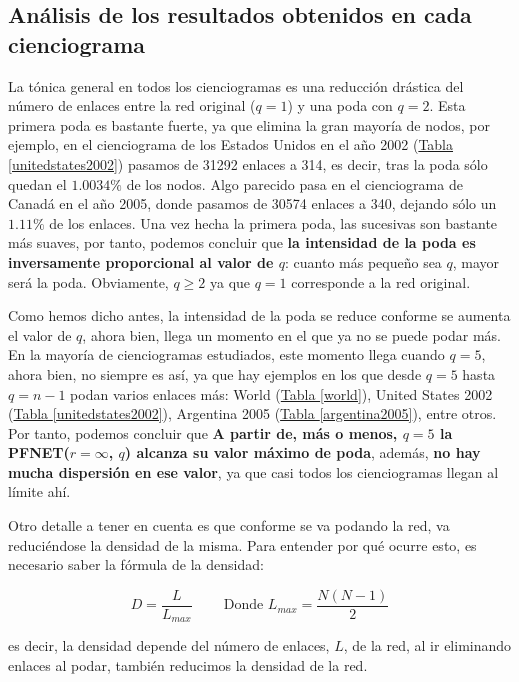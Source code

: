 \documentclass[10pt,a4paper,spanish]{article}
\numberwithin{equation}{section} %
\numberwithin{figure}{section} %
\numberwithin{table}{section} %
\begin{document}
\subsection{Análisis de los resultados obtenidos en cada cienciograma}
La tónica general en todos los cienciogramas es una reducción drástica del número de enlaces entre la red original ($q = 1$) y una poda con $q = 2$. Esta primera poda es bastante fuerte, ya que elimina la gran mayoría de nodos, por ejemplo, en el cienciograma de los Estados Unidos en el año 2002 (\hyperref[unitedstates2002]{Tabla \ref*{unitedstates2002}}) pasamos de 31292 enlaces a 314, es decir, tras la poda sólo quedan el $1.0034\%$ de los nodos. Algo parecido pasa en el cienciograma de Canadá en el año 2005, donde pasamos de 30574 enlaces a 340, dejando sólo un $1.11\%$ de los enlaces. Una vez hecha la primera poda, las sucesivas son bastante más suaves, por tanto, podemos concluir que \textbf{la intensidad de la poda es inversamente proporcional al valor de $q$}: cuanto más pequeño sea $q$, mayor será la poda. Obviamente, $q \geq 2$ ya que $q = 1$ corresponde a la red original.

Como hemos dicho antes, la intensidad de la poda se reduce conforme se aumenta el valor de $q$, ahora bien, llega un momento en el que ya no se puede podar más. En la mayoría de cienciogramas estudiados, este momento llega cuando $q = 5$, ahora bien, no siempre es así, ya que hay ejemplos en los que desde $q = 5$ hasta $q = n-1$ podan varios enlaces más: World (\hyperref[world]{Tabla \ref*{world}}), United States 2002 (\hyperref[unitedstates2002]{Tabla \ref*{unitedstates2002}}), Argentina 2005 (\hyperref[argentina2005]{Tabla \ref*{argentina2005}}), entre otros. Por tanto, podemos concluir que \textbf{A partir de, más o menos, $q = 5$ la PFNET($r = \infty$, $q$) alcanza su valor máximo de poda}, además, \textbf{no hay mucha dispersión en ese valor}, ya que casi todos los cienciogramas llegan al límite ahí.

Otro detalle a tener en cuenta es que conforme se va podando la red, va reduciéndose la densidad de la misma. Para entender por qué ocurre esto, es necesario saber la fórmula de la densidad:

\begin{displaymath}
    D = \frac{L}{L_{max}} \qquad\ \textrm{Donde } L_{max} = \frac{N(N-1)}{2}
\end{displaymath}

es decir, la densidad depende del número de enlaces, $L$, de la red, al ir eliminando enlaces al podar, también reducimos la densidad de la red.
\end{document}
